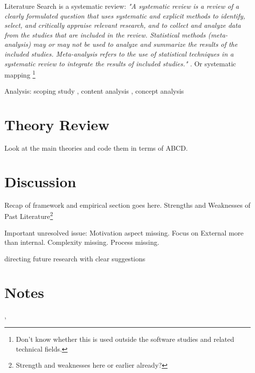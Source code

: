 \documentclass[nobib]{tufte-handout}
\begin{document}
Literature Search is a systematic review: \textit{"A systematic review is a review of a clearly formulated question that uses systematic and explicit methods to identify, select, and critically appraise relevant research, and to collect and analyze data from the studies that are included in the review. Statistical methods (meta-analysis) may or may not be used to analyze and summarize the results of the included studies. Meta-analysis refers to the use of statistical techniques in a systematic review to integrate the results of included studies."} \citep[p.1]{Moher2009}. Or systematic mapping \citep{Petersen2015}\footnote{Don't know whether this is used outside the software studies and related technical fields.}

Analysis: scoping study \citep{Arksey2005},  content analysis \citep{Mikkonen2020, Yoon2011}, concept analysis \citep{Siatkowski2007}

\section{Theory Review}
Look at the main theories and code them in terms of ABCD.

\section{Discussion}

 Recap of framework and empirical section goes here. Strengths and Weaknesses of Past Literature\footnote{Strength and weaknesses here or earlier already?}

 Important unresolved issue: Motivation aspect missing. Focus on External more than internal. Complexity missing. Process missing. 

 directing future research with clear suggestions

\section{Notes}
 \citet{Dirth2018}
 \citet{Yoon2011}, \citet{Siatkowski2007}

\newpage
\printbibliography
\end{document}
